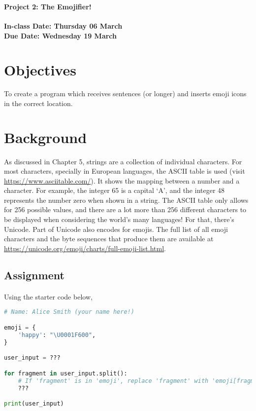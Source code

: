 \documentclass[letter,10pt]{article}
\begin{document}
    
    \huge
    \textbf{Project 2: The Emojifier!}
    \normalsize
    \\ ~~ \\
    \textbf{In-class Date: Thursday 06 March} \\
    \textbf{Due Date: Wednesday 19 March}
    
    \section*{Objectives}
    \paragraph{}To create a program which receives sentences (or longer) and inserts emoji icons in the correct location.
    
    \section*{Background}
    \paragraph{}As discussed in Chapter 5, strings are a collection of individual characters. For most characters, specially in European languages, the ASCII table is used (visit \url{https://www.asciitable.com/}). It shows the mapping between a number and a character. For example, the integer 65 is a capital `A', and the integer 48 represents the number zero when shown in a string. The ASCII table only allows for 256 possible values, and there are a lot more than 256 different characters to be displayed when considering the world's many languages! For that, there's Unicode. Part of Unicode also encodes for emojis. The full list of all emoji characters and the byte sequences that produce them are available at \url{https://unicode.org/emoji/charts/full-emoji-list.html}.
    
    \subsection*{Assignment}
    \paragraph{}Using the starter code below, 
    
    \begin{lstlisting}[language=python]
# Name: Alice Smith (your name here!)

emoji = {
    'happy': "\U0001F600",
}

user_input = ???

for fragment in user_input.split():
    # If 'fragment' is in 'emoji', replace 'fragment' with 'emoji[fragment]'
    ???

print(user_input)
    \end{lstlisting}
\end{document}

